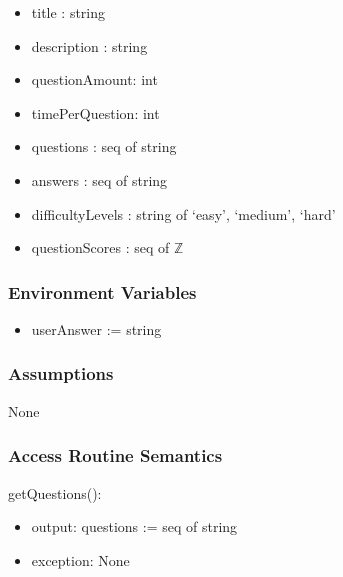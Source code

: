 \documentclass[12pt, titlepage]{article}
\begin{document}
\begin{itemize}
    \item title :  string
    \item description :  string
    \item questionAmount: int
    \item timePerQuestion: int
    \item questions : seq of string %
    \item answers : seq of string %
    \item difficultyLevels :  string of `easy', `medium', `hard'
    \item questionScores : seq of $\mathbb{Z}$  %
\end{itemize}

\subsubsection{Environment Variables}

\begin{itemize}
    \item userAnswer := string %
\end{itemize}

\subsubsection{Assumptions}

None 

\subsubsection{Access Routine Semantics}

\noindent getQuestions():
\begin{itemize}
\item output: questions := seq of string
\item exception: None
\end{itemize}
\end{document}
